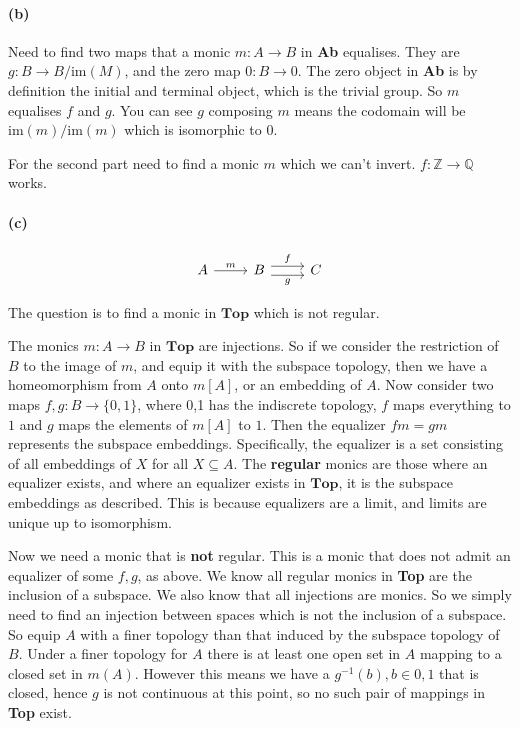 \documentclass{article}
\begin{document}
\paragraph{(b)}

Need to find two maps that a monic $m\colon A \rightarrow B$ in \textbf{Ab} equalises. They are $g: B \rightarrow B/\text{im}(M)$, and the zero map $0: B \rightarrow 0$. The zero object in \textbf{Ab} is by definition the initial and terminal object, which is the trivial group. So $m$ equalises $f$ and $g$. You can see $g$ composing $m$ means the codomain will be $\text{im}(m)/\text{im}(m)$ which is isomorphic to $0$.

For the second part need to find a monic $m$ which we can't invert. $f:\mathds{Z} \rightarrow \mathds{Q}$ works.

\paragraph{(c)}

\begin{equation*}
\label{eqn5143}
\begin{tikzcd}
 A \ar[r, "m"] &
 B \ar[r,shift left=.75ex,"f"]
   \ar[r,shift right=.75ex,swap,"g"] & C
\end{tikzcd}
\end{equation*}

The question is to find a monic in $\mathbf{Top}$ which is not regular.

The monics $m: A \rightarrow B$ in $\mathbf{Top}$ are injections. So if we consider the restriction of $B$ to the image of $m$, and equip it with the subspace topology, then we have a homeomorphism from $A$ onto $m[A]$, or an embedding of $A$.   Now consider two maps $f,g: B \rightarrow \{0,1\}$, where {0,1} has the indiscrete topology, $f$ maps everything to $1$ and $g$ maps the elements of $m[A]$ to $1$. Then the equalizer $fm=gm$ represents the subspace embeddings. Specifically, the equalizer is a set consisting of all embeddings of $X$ for all $X \subseteq A$. The \textbf{regular} monics are those where an equalizer exists, and where an equalizer exists in $\mathbf{Top}$, it is the subspace embeddings as described. This is because equalizers are a limit, and limits are unique up to isomorphism.

Now we need a monic that is \textbf{not} regular. This is a monic that does not admit an equalizer of some $f, g$, as above. We know all regular monics in \textbf{Top} are the inclusion of a subspace. We also know that all injections are monics. So we simply need to find an injection between spaces which is not the inclusion of a subspace.
So equip $A$ with a finer topology than that induced by the subspace topology of $B$. Under a finer topology for $A$ there is at least one open set in $A$ mapping to a closed set in $m(A)$. However this means we have a $g^{-1}(b), b \in {0, 1}$ that is closed, hence $g$ is not continuous at this point, so no such pair of mappings in \textbf{Top} exist.
\end{document}
